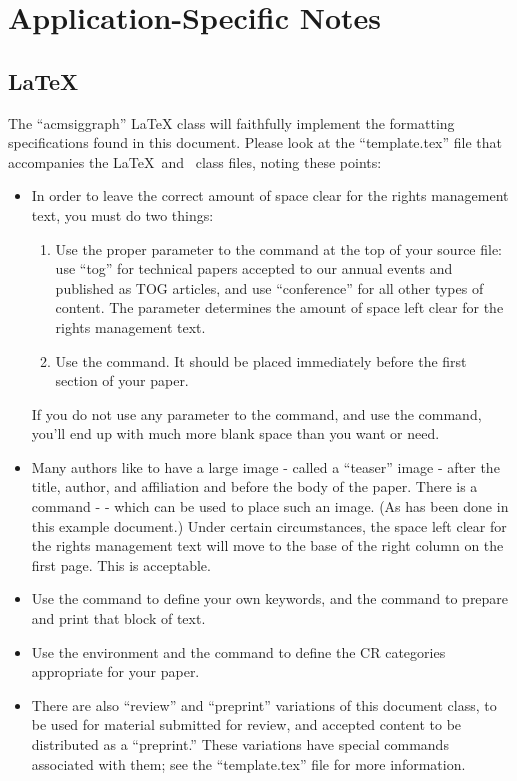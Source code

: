 \documentclass[tog]{acmsiggraph}
\begin{document}
\section{Application-Specific Notes}

\subsection{\LaTeX}

The ``acmsiggraph'' \LaTeX{} class will faithfully implement the formatting specifications found in this document. Please look at the ``template.tex'' file that accompanies the \LaTeX\ and \BibTeX\ class files, noting these points:
\begin{itemize}
\item In order to leave the correct amount of space clear for the rights management text, you must do two things: 
\begin{enumerate}
\item Use the proper parameter to the  command at the top of your source file: use ``tog'' for technical papers accepted to our annual events and published as TOG articles, and use ``conference'' for all other types of content. The parameter determines the amount of space left clear for the rights management text.
\item Use the  command. It should be placed immediately before the first section of your paper.
\end{enumerate}
If you do not use any parameter to the  command, and use the  command, you'll end up with much more blank space than you want or need.

\item Many authors like to have a large image - called a ``teaser'' image - after the title, author, and affiliation and before the body of the paper. There is a command -  - which can be used to place such an image. (As has been done in this example document.) Under certain circumstances, the space left clear for the rights management text will move to the base of the right column on the first page. This is acceptable.
\item Use the  command to define your own keywords, and the  command to prepare and print that block of text.
\item Use the  environment and the  command to define the CR categories appropriate for your paper.
\item There are also ``review'' and ``preprint'' variations of this document class, to be used for material submitted for review, and accepted content to be distributed as a ``preprint.'' These variations have special commands associated with them; see the ``template.tex'' file for more information.
\end{itemize}
\end{document}

